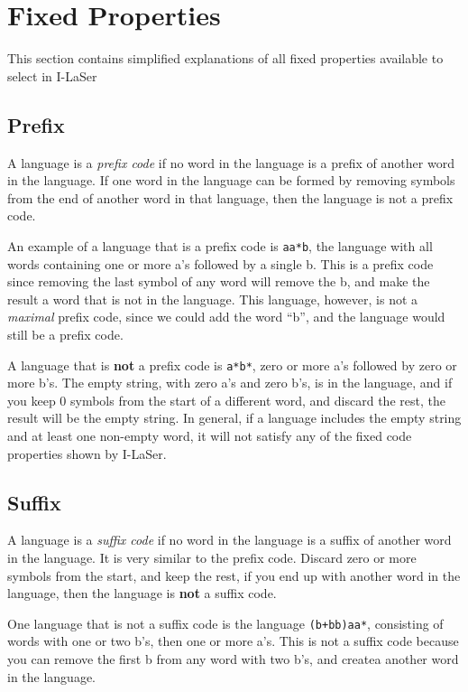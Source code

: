 \documentclass{article}
\begin{document}
\section{Fixed Properties}

This section contains simplified explanations of all fixed properties available to select in I-LaSer

\subsection{Prefix}
A language is a \textit{prefix code} if no word in the language is a prefix of another word in the language. If one word in the language can be formed by removing symbols from the end of another word in that language, then the language is not a prefix code.

\par An example of a language that is a prefix code is \verb-aa*b-, the language with all words containing one or more a's followed by a single b. This is a prefix code since removing the last symbol of any word will remove the b, and make the result a word that is not in the language. This language, however, is not a \textit{maximal} prefix code, since we could add the word ``b'', and the language would still be a prefix code.

\par A language that is \textbf{not} a prefix code is \verb-a*b*-, zero or more a's followed by zero or more b's. The empty string, with zero a's and zero b's, is in the language, and if you keep 0 symbols from the start of a different word, and discard the rest, the result will be the empty string. In general, if a language includes the empty string and at least one non-empty word, it will not satisfy any of the fixed code properties shown by I-LaSer.

\subsection{Suffix}
A language is a \textit{suffix code} if no word in the language is a suffix of another word in the language. It is very similar to the prefix code. Discard zero or more symbols from the start, and keep the rest, if you end up with another word in the language, then the language is \textbf{not} a suffix code.

\par One language that is not a suffix code is the language \verb-(b+bb)aa*-, consisting of words with one or two b's, then one or more a's. This is not a suffix code because you can remove the first b from any word with two b's, and createa another word in the language.
\end{document}
